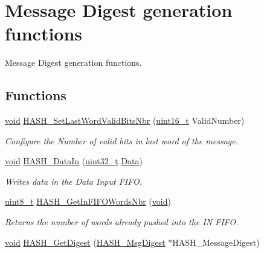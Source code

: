 \hypertarget{group___h_a_s_h___group2}{\section{Message Digest generation functions}
\label{group___h_a_s_h___group2}
}


Message Digest generation functions.  


\subsection*{Functions}
\begin{DoxyCompactItemize}
\item 
\hyperlink{group___n_a_m_e_ga18028b8badbf1ea7e704ccac3c488e82}{void} \hyperlink{group___h_a_s_h___group2_gac4d1fa51c9240ad0287b371564b5d2a6}{H\-A\-S\-H\-\_\-\-Set\-Last\-Word\-Valid\-Bits\-Nbr} (\hyperlink{stdint_8h_a273cf69d639a59973b6019625df33e30}{uint16\-\_\-t} Valid\-Number)
\begin{DoxyCompactList}\small\item\em Configure the Number of valid bits in last word of the message. \end{DoxyCompactList}\item 
\hyperlink{group___n_a_m_e_ga18028b8badbf1ea7e704ccac3c488e82}{void} \hyperlink{group___h_a_s_h___group2_ga9c4c0cebdeb1ce2631dd2eeab82107ef}{H\-A\-S\-H\-\_\-\-Data\-In} (\hyperlink{stdint_8h_a435d1572bf3f880d55459d9805097f62}{uint32\-\_\-t} \hyperlink{group___copter_control_b_l_ga6f3335509cc4943e20df66f72483910c}{Data})
\begin{DoxyCompactList}\small\item\em Writes data in the Data Input F\-I\-F\-O. \end{DoxyCompactList}\item 
\hyperlink{stdint_8h_aba7bc1797add20fe3efdf37ced1182c5}{uint8\-\_\-t} \hyperlink{group___h_a_s_h___group2_ga37bec5e637a57124f3179185d03537ab}{H\-A\-S\-H\-\_\-\-Get\-In\-F\-I\-F\-O\-Words\-Nbr} (\hyperlink{group___n_a_m_e_ga18028b8badbf1ea7e704ccac3c488e82}{void})
\begin{DoxyCompactList}\small\item\em Returns the number of words already pushed into the I\-N F\-I\-F\-O. \end{DoxyCompactList}\item 
\hyperlink{group___n_a_m_e_ga18028b8badbf1ea7e704ccac3c488e82}{void} \hyperlink{group___h_a_s_h___group2_ga23018d770837d6ab9f46941f105cc017}{H\-A\-S\-H\-\_\-\-Get\-Digest} (\hyperlink{struct_h_a_s_h___msg_digest}{H\-A\-S\-H\-\_\-\-Msg\-Digest} $\ast$H\-A\-S\-H\-\_\-\-Message\-Digest)

\end{DoxyCompactItemize}
